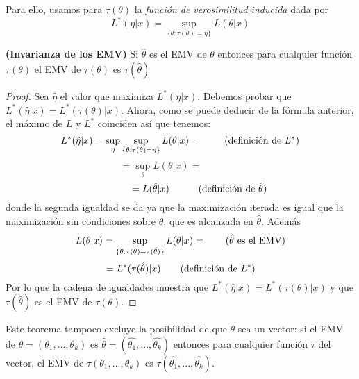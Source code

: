 Para ello, usamos para $\tau(\theta)$ la \textit{función de verosimilitud inducida} dada por \[ L^{*}(\eta \vert x) = \sup_{\lbrace \theta:\tau(\theta)=\eta \rbrace} L(\theta \vert x) \]
\begin{teorema}
\textbf{(Invarianza de los EMV)} Si $\hat{\theta}$ es el EMV de $\theta$  entonces para cualquier función $\tau(\theta)$ el EMV de $\tau(\theta)$ es $\tau(\hat{\theta})$
\end{teorema}
\begin{proof}
Sea $\hat{\eta}$ el valor que maximiza $L^{*}(\eta \vert x)$. Debemos probar que $L^{*}(\hat{\eta} \vert x) = L^{*}(\tau(\theta) \vert x)$. Ahora, como se puede deducir de la fórmula anterior, el máximo de $L$ y $L^{*}$ coinciden así que tenemos: 
\[ L^{*}(\hat{\eta} \vert x) = \sup_{\eta} \sup_{\lbrace \theta:\tau(\theta)=\eta \rbrace} L(\theta \vert x)= \quad \quad \textnormal{ (definición de } L^{*} \textnormal{)} \]
\[ =\sup_{\theta}L(\theta \vert x) = \quad \quad \quad \quad \]
\[\quad \quad \quad \quad  = L(\hat{\theta} \vert x) \quad \quad \quad \textnormal{(definición de } \hat{\theta} \textnormal{)} \]
donde la segunda igualdad se da ya que la maximización iterada es igual que la maximización sin condiciones sobre $\theta$, que es alcanzada en $\hat{\theta}$. Además
\[ L(\theta \vert x) = \sup_{\lbrace \theta:\tau(\theta)=\tau(\hat{\theta}) \rbrace} L(\theta \vert x)= \quad \quad \textnormal{(} \hat{\theta} \textnormal{ es el EMV)} \]
\[ =L^{*}(\tau(\hat{\theta}) \vert x) \quad \quad \textnormal{(definición de } L^{*} \textnormal{)} \]
Por lo que la cadena de igualdades muestra que $L^{*}(\hat{\eta} \vert x) = L^{*}(\tau(\theta) \vert x)$ y que $\tau(\hat{\theta})$ es el EMV de $\tau(\theta)$.
\end{proof}
Este teorema tampoco excluye la posibilidad de que $\theta$ sea un vector: si el EMV de $\theta=(\theta_{1},...,\theta_{k})$ es $\hat{\theta}=(\hat{\theta_{1}},...,\hat{\theta_{k}})$ entonces para cualquier función $\tau$ del vector, el EMV de $\tau(\theta_{1},...,\theta_{k})$ es $\tau(\hat{\theta_{1}},...,\hat{\theta_{k}})$. \cite{garthwaite2002statistical}
